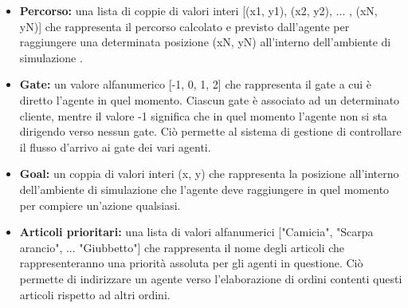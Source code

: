 \documentclass[12pt]{article}
\begin{document}
\begin{itemize}
\item \textbf{Percorso:} una lista di coppie di valori interi [(x1, y1), (x2, y2), ... , (xN, yN)] che rappresenta il percorso calcolato e previsto dall'agente per raggiungere una determinata posizione (xN, yN) all'interno dell'ambiente di simulazione .
\item \textbf{Gate:} un valore alfanumerico [-1, 0, 1, 2] che rappresenta il gate a cui è diretto l'agente in quel momento. Ciascun gate è associato ad un determinato cliente, mentre il valore -1 significa che in quel momento l'agente non si sta dirigendo verso nessun gate. Ciò permette al sistema di gestione di controllare il flusso d'arrivo ai gate dei vari agenti.
\item \textbf{Goal:} un coppia di valori interi (x, y) che rappresenta la posizione all'interno dell'ambiente di simulazione che l'agente deve raggiungere in quel momento per compiere un'azione qualsiasi.
\item \textbf{Articoli prioritari:} una lista di valori alfanumerici ["Camicia", "Scarpa arancio", ... "Giubbetto"] che rappresenta il nome degli articoli che rappresenteranno una priorità assoluta per gli agenti in questione. Ciò permette di indirizzare un agente verso l'elaborazione di ordini contenti questi articoli rispetto ad altri ordini.

\end{itemize}
\end{document}
